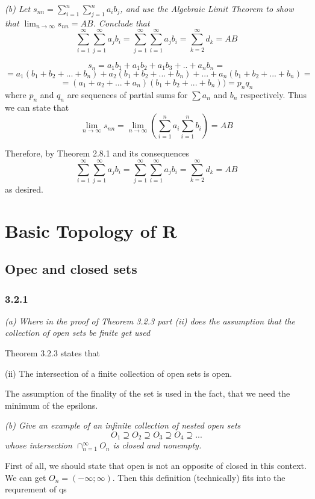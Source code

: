\documentclass[11pt,oneside,titlepage]{book}
\begin{document}
\textit{(b) Let $s_{nn} = \sum_{i = 1}^n\sum_{j = 1}^n a_i b_j$, and use the
  Algebraic Limit Theorem to show that $\lim_{n \to \infty} s_{nn} = AB$.
  Conclude that }
$$\sum_{i = 1}^{\infty} \sum_{j = 1}^{\infty} a_j b_i =
\sum_{j = 1}^{\infty} \sum_{i = 1}^{\infty} a_j b_i =
\sum_{k = 2}^{\infty}  d_k = AB$$

$$s_n = a_1 b_1 + a_1 b_2 + a_1 b_3 + .. + a_n b_n = $$
$$= a_1 (b_1 + b_2 + ... + b_n) + a_2 (b_1 + b_2 + ... + b_n) + ...
+ a_n(b_1 + b_2 + ... + b_n) = $$
$$= (a_1 + a_2 + ... + a_n)(b_1 + b_2 + ... + b_n)) = p_n q_n$$
where $p_n$ and $q_n$ are sequences of partial sums for $\sum a_n$ and
$b_n$ respectively. Thus we can state that
$$\lim_{n \to \infty} s_{nn} = \lim_{n \to \infty} (\sum_{i = 1}^{n} a_i 
\sum_{i = 1}^{n} b_i) = AB$$

Therefore, by Theorem 2.8.1 and its consequences
$$\sum_{i = 1}^{\infty} \sum_{j = 1}^{\infty} a_j b_i =
\sum_{j = 1}^{\infty} \sum_{i = 1}^{\infty} a_j b_i =
\sum_{k = 2}^{\infty}  d_k = AB$$
as desired.



\chapter{Basic Topology of R}

\section{Opec and closed sets}

\subsection*{3.2.1}
\textit{(a) Where in the proof of Theorem 3.2.3 part (ii) does the assumption
  that the collection of open sets be finite get used}

Theorem 3.2.3 states that

(ii) The intersection of a finite collection of open sets is open.

The assumption of the finality of the set is used in the fact, that we need
the minimum of the epsilons.

\textit{(b) Give an example of an infinite collection of nested open sets}
$$ O_1 \supseteq O_2 \supseteq O_3 \supseteq O_4 \supseteq ... $$
\textit{whose intersection $\cap_{n = 1}^{\infty} O_n$ is closed and nonempty.}

First of all, we should state that open is not an opposite of closed in this
context. We can get $O_n = (-\infty; \infty)$. Then this definition
(technically) fits into the requrement of qs
\end{document}
